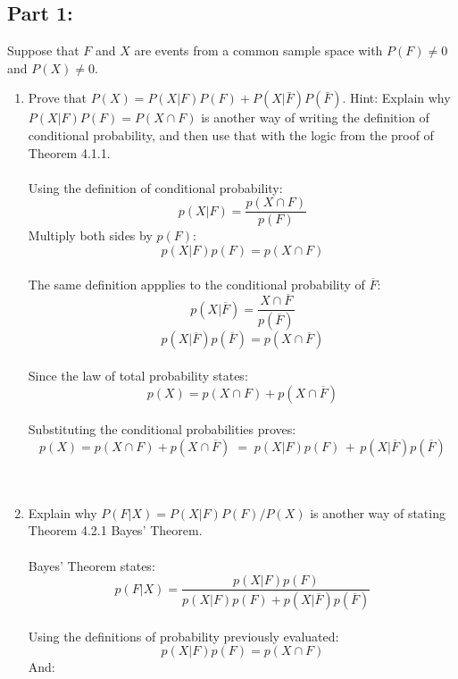 \documentclass{amsart}
\theoremstyle{definition}
\theoremstyle{Exercise}
\theoremstyle{remark}
\theoremstyle{rule}
\numberwithin{equation}{section}
\begin{document}
 \subsection*{Part 1:}
 Suppose that $F$ and $X$ are events from a common sample space with $P(F) \neq 0$ and $P(X) \neq 0$.
 \\
 \begin{enumerate}[label=(\alph*)]
     \item Prove that $P(X) = P(X|F)P(F) + P(X|\bar{F})P(\bar{F})$. Hint: Explain why $P(X|F)P(F) = P(X \cap F)$ is another way of writing the definition of conditional probability, and then use that with the logic from the proof of Theorem 4.1.1.
     \\\\
     Using the definition of conditional probability:\\
     $$p(X|F) = \frac{p(X \cap F)}{p(F)}$$
     Multiply both sides by $p(F)$:\\
     $$p(X|F)p(F) = p(X \cap F)$$\\
     The same definition appplies to the conditional probability of $\overline{F}$:\\
     $$p(X|\overline{F}) = \frac{X \cap \overline{F}}{p(\overline{F})}$$
     $$p(X|\overline{F})p(\overline{F}) = p(X \cap \overline{F})$$\\
     Since the law of total probability states:\\
     $$p(X) = p(X \cap F) + p(X \cap \overline{F})$$\\
     Substituting the conditional probabilities proves:\\
     $$p(X) = p(X \cap F) + p(X \cap \overline{F})\;=\;p(X|F)p(F)\,+\,p(X|\overline{F})p(\overline{F})$$
     \\\\
     \item Explain why $P(F|X) = P(X|F)P(F)/P(X)$ is another way of stating Theorem 4.2.1 Bayes’ Theorem.
     \\\\
     Bayes' Theorem states:\\
     $$p(F|X)=\frac{p(X|F)p(F)}{p(X|F)p(F)+p(X|\overline{F})p(\overline{F})}$$\\
     Using the definitions of probability previously evaluated:\\
     $$p(X|F)p(F) = p(X \cap F)$$
     And:\\\\

\end{enumerate}
\end{document}

